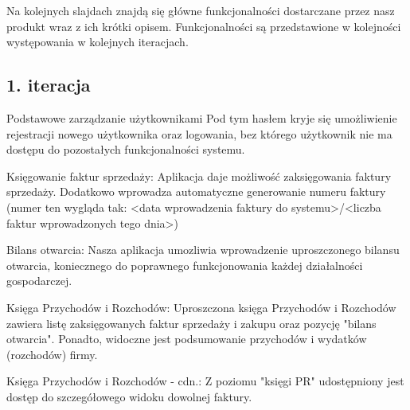 \documentclass{beamer}
\begin{document}
  \begin{frame}
    \begin{block}{}
      Na kolejnych slajdach znajdą się główne funkcjonalności dostarczane przez nasz produkt wraz z ich krótki opisem. Funkcjonalności są przedstawione w kolejności występowania w kolejnych iteracjach.
    \end{block}
  \end{frame}
\subsection{1. iteracja}
  \begin{frame}
    \begin{block}{}
      Podstawowe zarządzanie użytkownikami Pod tym hasłem kryje się umożliwienie rejestracji nowego użytkownika oraz logowania, bez którego użytkownik nie ma dostępu do pozostałych funkcjonalności systemu.
    \end{block}
  \end{frame}
  \begin{frame}
    \begin{block}{}
      Księgowanie faktur sprzedaży: Aplikacja daje możliwość zaksięgowania faktury sprzedaży. Dodatkowo wprowadza automatyczne generowanie numeru faktury (numer ten wygląda tak: <data wprowadzenia faktury do systemu>/<liczba faktur wprowadzonych tego dnia>)
    \end{block}
  \end{frame}
  \begin{frame}
    \begin{block}{}
      Bilans otwarcia: Nasza aplikacja umozliwia wprowadzenie uproszczonego bilansu otwarcia, koniecznego do poprawnego funkcjonowania każdej działalności gospodarczej.
    \end{block}
  \end{frame}
  \begin{frame}
    \begin{block}{}
      Księga Przychodów i Rozchodów: Uproszczona księga Przychodów i Rozchodów zawiera listę zaksięgowanych faktur sprzedaży i zakupu oraz pozycję "bilans otwarcia". Ponadto, widoczne jest podsumowanie przychodów i wydatków (rozchodów) firmy.
    \end{block}
  \end{frame}
  \begin{frame}
    \begin{block}{}
      Księga Przychodów i Rozchodów - cdn.: Z poziomu "księgi PR" udostępniony jest dostęp do szczegółowego widoku dowolnej faktury.
    \end{block}
  \end{frame}
\end{document}
